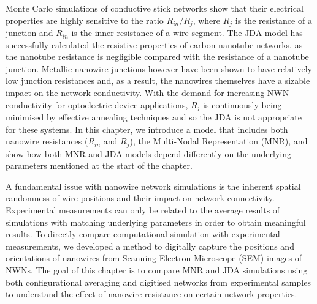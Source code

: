 Monte Carlo simulations of conductive stick networks show that their electrical properties are highly sensitive to the ratio $R_{in}/R_{j}$, where $R_j$ is the resistance of a junction and $R_{in}$ is the inner resistance of a wire segment\cite{li2009,hicks2009,zezelj2012}. The JDA model has successfully calculated the resistive properties of carbon nanotube networks, as the nanotube resistance is negligible compared with the resistance of a nanotube junction\cite{nirmalraj2009,hecht2006}. Metallic nanowire junctions however have been shown to have relatively low junction resistances\cite{bellew2015} and, as a result, the nanowires themselves have a sizable impact on the network conductivity. With the demand for increasing NWN conductivity for optoelectric device applications\cite{bellet2017,gong2017,langley2013}, $R_j$ is continuously being minimised by effective annealing techniques\cite{madaria2010,hwang2014,liangbing2010,nirmalraj2012} and so the JDA is not appropriate for these systems. In this chapter, we introduce a model that includes both nanowire resistances ($R_{in}$ and $R_j$), the Multi-Nodal Representation (MNR), and show how both MNR and JDA models depend differently on the underlying parameters mentioned at the start of the chapter.

A fundamental issue with nanowire network simulations is the inherent spatial randomness of wire positions and their impact on network connectivity. Experimental measurements can only be related to the average results of simulations with matching underlying parameters in order to obtain meaningful results\cite{mutiso2013}. To directly compare computational simulation with experimental measurements, we developed a method to digitally capture the positions and orientations of nanowires from Scanning Electron Microscope (SEM) images of NWNs. The goal of this chapter is to compare MNR and JDA simulations using both configurational averaging and digitised networks from experimental samples to understand the effect of nanowire resistance on certain network properties.

